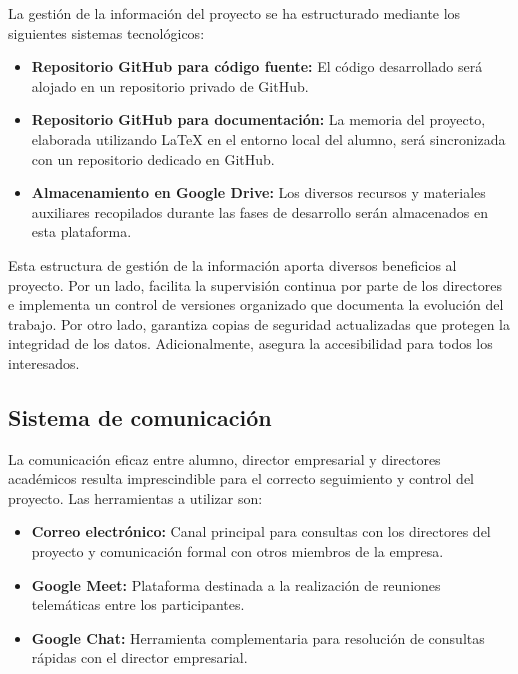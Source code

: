 La gestión de la información del proyecto se ha estructurado mediante los siguientes sistemas tecnológicos:
\begin{itemize}
\item \textbf{Repositorio GitHub para código fuente:} El código desarrollado será alojado en un repositorio privado de GitHub.
\item \textbf{Repositorio GitHub para documentación:} La memoria del proyecto, elaborada utilizando LaTeX en el entorno local del alumno, será sincronizada con un repositorio dedicado en GitHub.
\item \textbf{Almacenamiento en Google Drive:} Los diversos recursos y materiales auxiliares recopilados durante las fases de desarrollo serán almacenados en esta plataforma.
\end{itemize}
Esta estructura de gestión de la información aporta diversos beneficios al proyecto. Por un lado, facilita la supervisión continua por parte de los directores e implementa un control de versiones organizado que documenta la evolución del trabajo. Por otro lado, garantiza copias de seguridad actualizadas que protegen la integridad de los datos. Adicionalmente, asegura la accesibilidad para todos los interesados.


\subsection{Sistema de comunicación}
La comunicación eficaz entre alumno, director empresarial y directores académicos resulta imprescindible para el correcto seguimiento y control del proyecto. Las herramientas a utilizar son:
\begin{itemize}
\item\textbf{Correo electrónico: }Canal principal para consultas con los directores del proyecto y comunicación formal con otros miembros de la empresa.
\item\textbf{Google Meet: }Plataforma destinada a la realización de reuniones telemáticas entre los participantes.
\item\textbf{Google Chat: }Herramienta complementaria para resolución de consultas rápidas con el director empresarial.
\end{itemize}

